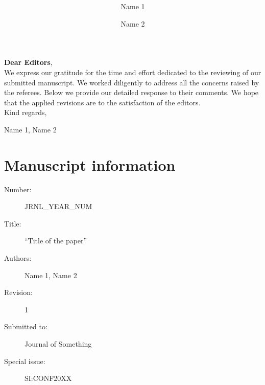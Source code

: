 \documentclass{article}
\author[1]{Name 1}
\author[2]{Name 2}
\affil[1]{University 1, City 1, Country 1}
\affil[2]{University 3, City 2, Country 2}
\date{}
\title{\textbf{\PaperTitle}}
\def\PaperTitle{Title of the paper}
\def\PaperId{{JRNL\_YEAR\_NUM}}
\def\PaperRevision{1}
\def\SpecialIssueId{{SI:CONF20XX}}
\def\Journal{{Journal of Something}}
\def\Authors{Name 1, Name 2}
\begin{document}
  
  \maketitle
  
  \noindent \textbf{Dear Editors},
  \\[2em]
  \indent We express our gratitude for the time and effort dedicated to the reviewing of our submitted manuscript.
  We worked diligently to address all the concerns raised by the referees.
  Below we provide our detailed response to their comments.
  We hope that the applied revisions are to the satisfaction of the editors.
  \\[2em]
  Kind regards,
  \begin{flushright}
    \Authors
  \end{flushright}
  \vfill
  \section*{Manuscript information}
  \begin{description}
    \item[Number:] \PaperId
    \item[Title:] ``\PaperTitle''
    \item[Authors:] \Authors
    \item[Revision:] \PaperRevision
    \item[Submitted to:] \Journal
    \item[Special issue:] \SpecialIssueId
  \end{description}
  \pagebreak
  
  {
    \hypersetup{linkcolor=black}
    \tableofcontents
    \pagebreak
  }

  
  
\end{document}
